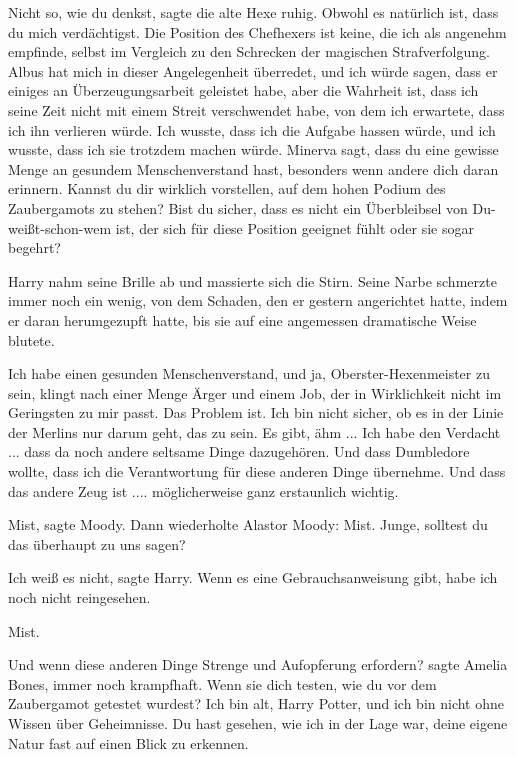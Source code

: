 \glqq{}Nicht so, wie du denkst\grqq{}, sagte die alte Hexe ruhig. \glqq{}Obwohl es
natürlich ist, dass du mich verdächtigst. Die Position des Chefhexers ist keine,
die ich als angenehm empfinde, selbst im Vergleich zu den Schrecken der
magischen Strafverfolgung. Albus hat mich in dieser Angelegenheit überredet, und
ich würde sagen, dass er einiges an Überzeugungsarbeit geleistet habe, aber die
Wahrheit ist, dass ich seine Zeit nicht mit einem Streit verschwendet habe, von
dem ich erwartete, dass ich ihn verlieren würde. Ich wusste, dass ich die
Aufgabe hassen würde, und ich wusste, dass ich sie trotzdem machen würde.
Minerva sagt, dass du eine gewisse Menge an gesundem Menschenverstand hast,
besonders wenn andere dich daran erinnern. Kannst du dir wirklich vorstellen,
auf dem hohen Podium des Zaubergamots zu stehen? Bist du sicher, dass es nicht
ein Überbleibsel von Du-weißt-schon-wem ist, der sich für diese Position
geeignet fühlt oder sie sogar begehrt?\grqq{}

Harry nahm seine Brille ab und massierte sich die Stirn. Seine Narbe schmerzte
immer noch ein wenig, von dem Schaden, den er gestern angerichtet hatte, indem
er daran herumgezupft hatte, bis sie auf eine angemessen dramatische Weise
blutete.

\glqq{}Ich habe einen gesunden Menschenverstand, und ja, Oberster-Hexenmeister zu
sein, klingt nach einer Menge Ärger und einem Job, der in Wirklichkeit nicht im
Geringsten zu mir passt. Das Problem ist. Ich bin nicht sicher, ob es in der
Linie der Merlins nur darum geht, das zu sein. Es gibt, ähm ... Ich habe den
Verdacht ... dass da noch andere seltsame Dinge dazugehören. Und dass Dumbledore
wollte, dass ich die Verantwortung für diese anderen Dinge übernehme. Und dass
das andere Zeug ist .... möglicherweise ganz erstaunlich wichtig.\grqq{}

\glqq{}Mist\grqq{}, sagte Moody. Dann wiederholte Alastor Moody: \glqq{}Mist.
Junge, solltest du das überhaupt zu uns sagen?\grqq{}

\glqq{}Ich weiß es nicht\grqq{}, sagte Harry. \glqq{}Wenn es eine
Gebrauchsanweisung gibt, habe ich noch nicht reingesehen.\grqq{}

\glqq{}Mist.\grqq{}

\glqq{}Und wenn diese anderen Dinge Strenge und Aufopferung erfordern?\grqq{}
sagte Amelia Bones, immer noch krampfhaft. \glqq{}Wenn sie dich testen, wie du
vor dem Zaubergamot getestet wurdest? Ich bin alt, Harry Potter, und ich bin
nicht ohne Wissen über Geheimnisse. Du hast gesehen, wie ich in der Lage war,
deine eigene Natur fast auf einen Blick zu erkennen.\grqq{}

